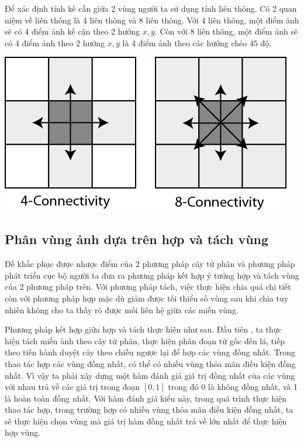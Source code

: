 \documentclass[12pt, oneside, a4paper]{book}
\begin{document}
Để xác định tính kế cần giữa 2 vùng người ta sử dụng tính liên thông. Có 2 quan niệm về liên thông là 4 liên thông và 8 liên thông. Với 4 liên thông,  một điểm ảnh sẽ có 4 điểm ảnh kế cận theo 2 hướng $x,y$. Còn với 8 liên thông, một điểm ảnh sẽ có 4 điểm ảnh theo 2 hướng $x,y$ là 4 điểm ảnh theo các hướng chéo $45$ độ.
\begin{center}
\includegraphics[scale=0.7]{figure/4-8-connectivity.png}
\end{center}
\subsection{Phân vùng ảnh dựa trên hợp và tách vùng}
Đề khắc phục được nhược điểm của 2 phương pháp cây tứ phân và phương pháp phát triển cục bộ người ta đưa ra phương pháp kết hợp ý tưởng hợp và tách vùng của 2 phương pháp trên. Với phương pháp tách, việc thực hiện chia quá chi tiết còn với phương pháp hợp mặc dù giảm được tối thiểu số vùng sau khi chia tuy nhiên không cho ta thấy rõ được mối liên hệ giữa các miền vùng.

Phương pháp kết hợp giữa hợp và tách thực hiện như sau. Đầu tiên , ta thực hiện tách miền ảnh theo cây tứ phân, thực hiện phân đoạn từ gốc đến lá, tiếp theo tiến hành duyệt cây theo chiều ngược lại để hợp các vùng đồng nhất. Trong thao tác hợp các vùng đồng nhất, có thể có nhiều vùng thỏa mãn điều kiện đồng nhất. Vì vậy ta phải xây dựng một hàm đánh giá giá trị đồng nhất của các vùng với nhau trả về các giá trị trong đoạn $[0,1]$ trong  đó 0 là không đồng nhất, và 1 là hoàn toàn đồng nhất. Với hàm đánh giá kiểu này,  trong quá trình thực hiện thao tác hợp, trong trường hợp có nhiều vùng thỏa mãn điều kiện đồng nhất, ta sẽ thực hiện chọn vùng mà giá trị hàm đồng nhất trả về lớn nhất để thực hiện hợp vùng.
\end{document}
